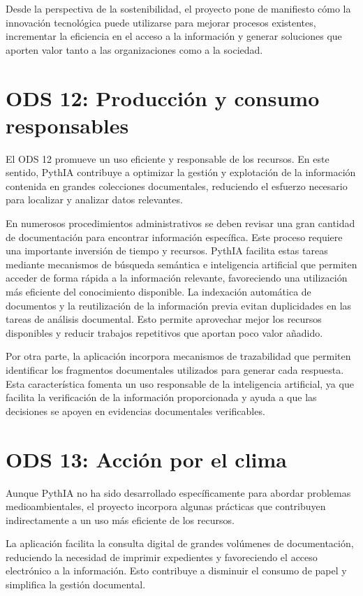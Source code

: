 Desde la perspectiva de la sostenibilidad, el proyecto pone de manifiesto cómo la innovación tecnológica puede utilizarse para mejorar procesos existentes, incrementar la eficiencia en el acceso a la información y generar soluciones que aporten valor tanto a las organizaciones como a la sociedad.

\section{ODS 12: Producción y consumo responsables}

El ODS 12 promueve un uso eficiente y responsable de los recursos. En este sentido, PythIA contribuye a optimizar la gestión y explotación de la información contenida en grandes colecciones documentales, reduciendo el esfuerzo necesario para localizar y analizar datos relevantes.

En numerosos procedimientos administrativos se deben revisar una gran cantidad de documentación para encontrar información específica. Este proceso requiere una importante inversión de tiempo y recursos. PythIA facilita estas tareas mediante mecanismos de búsqueda semántica e inteligencia artificial que permiten acceder de forma rápida a la información relevante, favoreciendo una utilización más eficiente del conocimiento disponible. La indexación automática de documentos y la reutilización de la información previa evitan duplicidades en las tareas de análisis documental. Esto permite aprovechar mejor los recursos disponibles y reducir trabajos repetitivos que aportan poco valor añadido.

Por otra parte, la aplicación incorpora mecanismos de trazabilidad que permiten identificar los fragmentos documentales utilizados para generar cada respuesta. Esta característica fomenta un uso responsable de la inteligencia artificial, ya que facilita la verificación de la información proporcionada y ayuda a que las decisiones se apoyen en evidencias documentales verificables.

\section{ODS 13: Acción por el clima}

Aunque PythIA no ha sido desarrollado específicamente para abordar problemas medioambientales, el proyecto incorpora algunas prácticas que contribuyen indirectamente a un uso más eficiente de los recursos.

La aplicación facilita la consulta digital de grandes volúmenes de documentación, reduciendo la necesidad de imprimir expedientes y favoreciendo el acceso electrónico a la información. Esto contribuye a disminuir el consumo de papel y simplifica la gestión documental.

